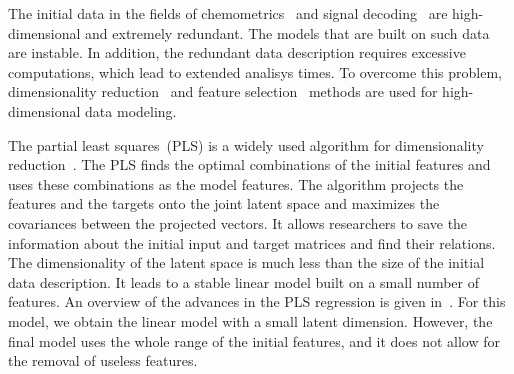 \documentclass[12pt,twoside]{article}
\theoremstyle{definition}
\begin{document}
The initial data in the fields of chemometrics~\cite{karimi2014leukemia,lin2016equivalence} and signal decoding~\cite{eliseyev2014stable,eliseyev2012l1} are high-dimensional and extremely redundant.
The models that are built on such data are instable. 
In addition, the redundant data description requires excessive computations, which lead to extended analisys times. 
To overcome this problem, dimensionality reduction~\cite{chun2010sparse,mehmood2012review} and feature selection~\cite{katrutsa2015stress,li2017feature} methods are used  for high-dimensional data modeling. 

The partial least squares~(PLS) is a widely used algorithm for dimensionality reduction~\cite{lauzon2018sequential,engel2017kernel,biancolillo2017extension,hervas2018sparse}. 
The PLS finds the optimal combinations of the initial features and uses these combinations as the model features. 
The algorithm projects the features and the targets onto the joint latent space and maximizes the covariances between the projected vectors. 
It allows researchers to save the information about the initial input and target matrices and find their relations. 
The dimensionality of the latent space is much less than the size of the initial data description. 
It leads to a stable linear model built on a small number of features. 
An overview of the advances in the PLS regression is given in~\cite{rosipal2006overview,rosipal2011nonlinear}.
For this model, we obtain the linear model with a small latent dimension.
However, the final model uses the whole range of the initial features, and it does not allow for the removal of useless features. 
\end{document}
